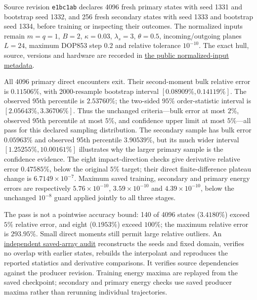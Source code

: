 \documentclass[11pt,letterpaper]{article}
\begin{document}
Source revision \texttt{e1bc1ab} declares 4096 fresh primary states with
seed 1331 and bootstrap seed 1332, and 256 fresh secondary states with seed
1333 and bootstrap seed 1334, before training or inspecting their outcomes.
The normalized inputs remain $m=q=1$, $B=2$, $\kappa=0.03$,
$\lambda_s=3$, $\theta=0.5$, incoming/outgoing planes $L=24$, maximum
DOP853 step $0.2$ and relative tolerance $10^{-10}$. The exact hull,
source, versions and hardware are recorded in
\href{https://github.com/rogeriojorge/sato-morrison/blob/main/results/scattering_table/refined8_validation4096/metadata.json}{the public normalized-input metadata}.

All 4096 primary direct encounters exit. Their second-moment bulk relative
error is $0.11506\%$, with 2000-resample bootstrap interval
$[0.08909\%,0.14119\%]$. The observed 95th percentile is $2.53760\%$;
the two-sided $95\%$ order-statistic interval is
$[2.05643\%,3.36706\%]$. Thus the unchanged criteria---bulk error at most
$2\%$, observed 95th percentile at most $5\%$, and confidence upper limit
at most $5\%$---all pass for this declared sampling distribution. The
secondary sample has bulk error $0.05963\%$ and observed 95th percentile
$3.90539\%$, but its much wider interval $[1.25255\%,10.00161\%]$
illustrates why the larger primary sample is the confidence evidence.
The eight impact-direction checks give derivative relative error
$0.47585\%$, below the original $5\%$ target; their direct finite-difference
plateau change is $6.7149\times10^{-7}$. Maximum saved training, secondary
and primary energy errors are respectively $5.76\times10^{-10}$,
$3.59\times10^{-10}$ and $4.39\times10^{-10}$, below the unchanged
$10^{-8}$ guard applied jointly to all three stages.

The pass is not a pointwise accuracy bound: 140 of 4096 states
($3.4180\%$) exceed $5\%$ relative error, and eight ($0.1953\%$) exceed
$100\%$; the maximum relative error is $293.95\%$. Small direct moments
still permit large relative outliers. An
\href{https://github.com/rogeriojorge/sato-morrison/blob/main/results/scattering_table/refined8_validation4096/audit.json}{independent saved-array audit}
reconstructs the seeds and fixed domain, verifies no overlap with earlier
states, rebuilds the interpolant and reproduces the reported statistics and
derivative comparisons. It verifies source dependencies against the producer
revision. Training energy maxima are replayed from the saved checkpoint;
secondary and primary energy checks use saved producer maxima rather than
rerunning individual trajectories.
\end{document}
